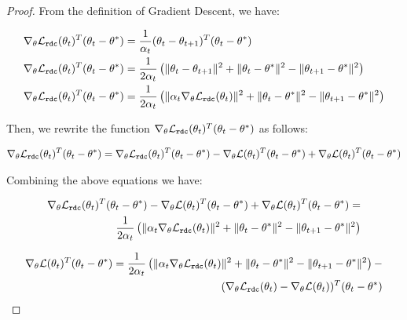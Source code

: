 \begin{proof}
    From the definition of Gradient Descent, we have:

    \begin{align}
    \nabla_{\theta} \mathcal L_{\mathtt{rdc}}(\theta_t)^T(\theta_t - \theta^*) &= \frac{1}{\alpha_t}(\theta_t-\theta_{t+1})^T(\theta_t-\theta^*) \\
    \nabla_{\theta} \mathcal L_{\mathtt{rdc}}(\theta_t)^T(\theta_t - \theta^*) &= \frac{1}{2\alpha_t}\left(\|\theta_t-\theta_{t+1}\|^2 + \|\theta_t-\theta^*\|^2 - \|\theta_{t+1}-\theta^*\|^2\right) \\
    \nabla_{\theta} \mathcal L_{\mathtt{rdc}}(\theta_t)^T(\theta_t - \theta^*) &= \frac{1}{2\alpha_t}\left(\|\alpha_t \nabla_{\theta} \mathcal L_{\mathtt{rdc}}(\theta_t)\|^2 + \|\theta_t-\theta^*\|^2 - \|\theta_{t+1}-\theta^*\|^2\right)
    \end{align}

    Then, we rewrite the function $\nabla_{\theta} \mathcal L_{\mathtt{rdc}}(\theta_t)^T(\theta_t - \theta^*)$ as follows:

    \begin{align}
        \nabla_{\theta} \mathcal L_{\mathtt{rdc}}(\theta_t)^T(\theta_t - \theta^*) = \nabla_{\theta} \mathcal L_{\mathtt{rdc}}(\theta_t)^T(\theta_t - \theta^*) - \nabla_{\theta} \mathcal{L}(\theta_t)^T(\theta_t - \theta^*) + \nabla_{\theta} \mathcal{L}(\theta_t)^T(\theta_t - \theta^*)
    \end{align}

    Combining the above equations we have:

    \begin{align}
    \nabla_{\theta} \mathcal L_{\mathtt{rdc}}(\theta_t)^T(\theta_t - \theta^*) - \nabla_{\theta} \mathcal{L}(\theta_t)^T(\theta_t - \theta^*) + \nabla_{\theta} \mathcal{L}(\theta_t)^T(\theta_t - \theta^*) = \\
    \frac{1}{2\alpha_t}\left(\|\alpha_t\nabla_{\theta} \mathcal L_{\mathtt{rdc}}(\theta_t)\|^2 + \|\theta_t - \theta^*\|^2 - \|\theta_{t+1} - \theta^*\|^2\right)
    \end{align}

    \begin{align}
    \nabla_{\theta} \mathcal{L}(\theta_t)^T(\theta_t - \theta^*) =
    \frac{1}{2\alpha_t}\left(\|\alpha_t\nabla_{\theta} \mathcal L_{\mathtt{rdc}}(\theta_t)\|^2 + \|\theta_t - \theta^*\|^2 - \|\theta_{t+1} - \theta^*\|^2\right) - \\ (\nabla_{\theta} \mathcal L_{\mathtt{rdc}}(\theta_t) - \nabla_{\theta} \mathcal{L}(\theta_t))^T(\theta_t - \theta^*)
    \end{align}


\end{proof}
